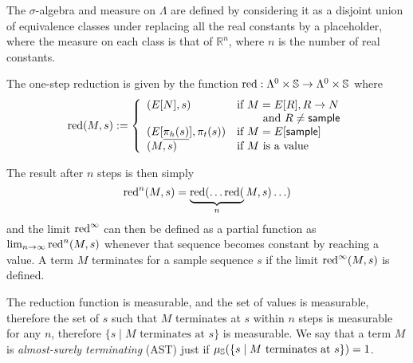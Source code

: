 The $\sigma$-algebra and measure on $\Lambda$ are defined by considering it as a disjoint union of equivalence classes under replacing all the real constants by a placeholder, where the measure on each class is that of $\mathbb{R}^n$, where $n$ is the number of real constants.

The one-step reduction is given by the function $\operatorname{red} : \Lambda^0 \times {\mathbb{S}} \to \Lambda^0 \times {\mathbb{S}}$ where
\begin{equation*}
\operatorname{red}(M,s) := \left\{
    \begin{array}{ll}
        (E[N],s) & \text{if } M = E[R], R \to N\\
        & \qquad \text{ and } R \neq \mathsf{sample} \\
        (E[\underline{\pi_h(s)}],\pi_t(s)) & \text{if } M = E[\mathsf{sample}] \\
        (M,s) & \text{if } M \text{ is a value}
    \end{array} \right .
\end{equation*}

The result after $n$ steps is then simply 
\[
\operatorname{red}^n(M,s) = \underbrace{\operatorname{red}(\ldots\operatorname{red}(}_n M,s)\ldots)
\] 
and the limit $\operatorname{red}^\infty$ can then be defined as a partial function as $\lim_{n \to \infty} \operatorname{red}^n(M,s)$ whenever that sequence becomes constant by reaching a value. A term $M$ terminates for a sample sequence $s$ if the limit $\operatorname{red}^\infty(M,s)$ is defined.

The reduction function is measurable, and the set of values is measurable, therefore the set of $s$ such that $M$ terminates at $s$ within $n$ steps is measurable for any $n$, therefore $\{s \mid M \text{ terminates at } s \}$ is measurable. 
We say that a term $M$ is \emph{almost-surely terminating} (AST) just if $\mu_{{\mathbb{S}}}(\{s \mid M \text{ terminates at } s\}) = 1$.

